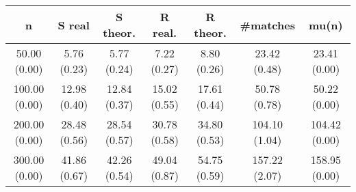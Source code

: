 \begin{center}
\begin{tabular}{c | c | c | c | c | c | c}
n & S real & S theor. & R real. & R theor. & #matches & mu(n)\\ \hline
50.00 (0.00) & 5.76 (0.23) & 5.77 (0.24) & 7.22 (0.27) & 8.80 (0.26) & 23.42 (0.48) & 23.41 (0.00) \\
100.00 (0.00) & 12.98 (0.40) & 12.84 (0.37) & 15.02 (0.55) & 17.61 (0.44) & 50.78 (0.78) & 50.22 (0.00) \\
200.00 (0.00) & 28.48 (0.56) & 28.54 (0.57) & 30.78 (0.58) & 34.80 (0.53) & 104.10 (1.04) & 104.42 (0.00) \\
300.00 (0.00) & 41.86 (0.67) & 42.26 (0.54) & 49.04 (0.87) & 54.75 (0.59) & 157.22 (2.07) & 158.95 (0.00) \\
\end{tabular}
\end{center}
